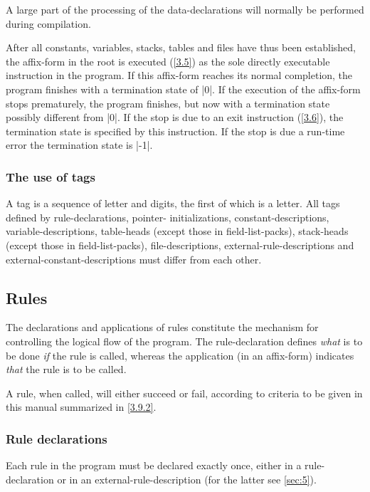\documentclass{article}
\newcommand\g[1]{{\sf #1}}
\begin{document}
A large part of the processing of the \g{data-declaration}s will normally be
performed during compilation.

After all constants, variables, stacks, tables and files have thus been
established, the \g{affix-form} in the \g{root} is executed (\ref{3.5}) as the
sole
directly executable instruction in the program. If this \g{affix-form}
reaches its normal completion, the program finishes with a termination state
of \pp|0|. If the execution of the \g{affix-form} stops prematurely, the
program finishes, but now with a termination state possibly different from
\pp|0|. If the stop is due to an \g{exit} instruction (\ref{3.6}), the termination state
is specified by this instruction. If the stop is due a run-time error the
termination state is \pp|-1|.

\subsubsection{The use of \g{tag}s}\label{3.1.2}
A \g{tag} is a sequence of letter and digits, the first of which is a
letter. All \g{tag}s defined by \g{rule-declaration}s, \g{pointer-{}
initialization}s, \g{constant-description}s, \g{variable-description}s,
\g{table-head}s (except those in \g{field-list-pack}s), \g{stack-head}s
(except those in \g{field-list-pack}s), \g{file-description}s, 
\g{external-rule-description}s
and \g{external-constant-description}s must differ from each
other.

\subsection{Rules} \label{3.2}
The declarations and applications of \g{rule}s constitute the mechanism for
controlling the logical flow of the program. The \g{rule-declaration}
defines \emph{what} is to be done \emph{if} the rule is called, whereas
the application (in an \g{affix-form}) indicates \emph{that} the rule is
to be called.

A rule, when called, will either succeed or fail, according to criteria
to be given in this manual summarized in \ref{3.9.2}.

\subsubsection{Rule declarations}\label{3.2.1}

Each rule in the program must be declared exactly once, either in a
\g{rule-declaration} or in an \g{external-rule-description} (for the latter see
\ref{sec:5}).
\end{document}
